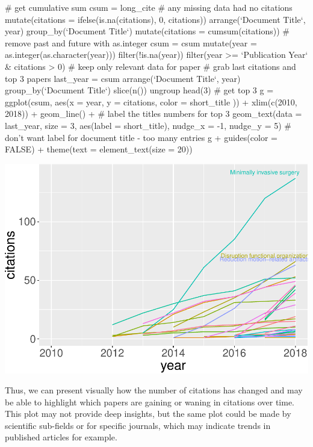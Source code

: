 \begin{Schunk}
\begin{Sinput}
# get cumulative sum
csum = long_cite %
  # any missing data had no citations
  mutate(citations = ifelse(is.na(citations), 0, citations)) %
  arrange(`Document Title`, year) %
  group_by(`Document Title`) %
  mutate(citations = cumsum(citations))
# remove past and future with as.integer
csum = csum %
  mutate(year = as.integer(as.character(year))) %
  filter(!is.na(year)) %
  filter(year >= `Publication Year` & citations > 0) # keep only relevant data for paper
# grab last citations and top 3 papers
last_year = csum %
  arrange(`Document Title`, year) %
  group_by(`Document Title`) %
  slice(n()) %
  ungroup %
  head(3)  # get top 3
g = ggplot(csum, 
           aes(x = year, y = citations, color = short_title  )) +
  xlim(c(2010, 2018)) + geom_line() + 
  # label the titles numbers for top 3
  geom_text(data = last_year, size = 3, aes(label = short_title), 
            nudge_x = -1, nudge_y = 5)
# don't want label for document title - too many entries
g + guides(color = FALSE) + theme(text = element_text(size = 20))
\end{Sinput}

\includegraphics{muschelli_files/figure-latex/unnamed-chunk-24-1} \end{Schunk}

Thus, we can present visually how the number of citations has changed
and may be able to highlight which papers are gaining or waning in
citations over time. This plot may not provide deep insights, but the
same plot could be made by scientific sub-fields or for specific
journals, which may indicate trends in published articles for example.

